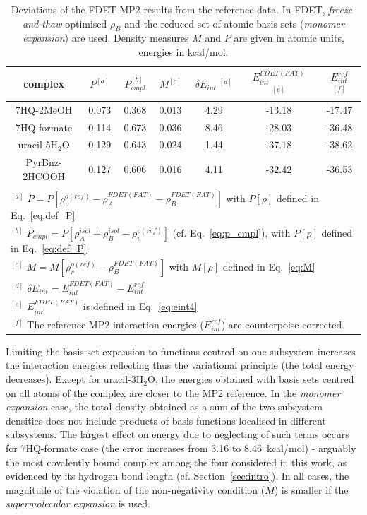 \documentclass[amsmath,amssymb,preprint,aip,jcp]{revtex4-1}
\begin{document}
\begin{table}
{
\begin{center}
\begin{tabular}{|c|c|c|c|c|c|c|}
\hline
 complex & $P^{[a]}$ & $P_{cmpl}^{[b]}$ & $M^{[c]}$ & $\delta E_{int}\;^{[d]}$ & $E^{FDET(FAT)}_{int}$ $^{[e]}$ & $E_{int}^{ref}$ $^{[f]}$ \\ \hline
7HQ-2MeOH & 0.073 & 0.368 & 0.013 & 4.29 & -13.18 & -17.47 \\ \hline
7HQ-formate & 0.114 & 0.673 & 0.036 & 8.46 & -28.03 & -36.48 \\ \hline
uracil-5H$_2$O & 0.129 & 0.643 & 0.024 & 1.44 & -37.18 & -38.62 \\ \hline
PyrBnz-2HCOOH & 0.127 & 0.606 & 0.016 & 4.11 & -32.42 & -36.53 \\ \hline
\multicolumn{7}{c}{ } \\
\multicolumn{7}{l}{$^{[a]}$ $P=P[\rho_v^{o(ref)} - \rho_{A}^{FDET(FAT)}-\rho_B^{FDET(FAT)}]$  with $P[\rho]$ defined in Eq.~\ref{eq:def_P}}\\
\multicolumn{7}{l}{$^{[b]}$ $P_{cmpl}=P[\rho_A^{isol}+\rho_B^{isol} - \rho_v^{o(ref)}]$ (cf. Eq.~\ref{eq:p_cmpl}), with $P[\rho]$ defined in Eq.~\ref{eq:def_P}}\\
\multicolumn{7}{l}{$^{[c]}$ $M=M[\rho_v^{o(ref)} - \rho^{FDET(FAT)}_{B}]$ with $M[\rho]$ defined in Eq.~\ref{eq:M}}\\
\multicolumn{7}{l}{$^{[d]}$ $\delta E_{int}=E^{FDET(FAT)}_{int}-E_{int}^{ref}$} \\
\multicolumn{7}{l}{$^{[e]}$ $E^{FDET(FAT)}_{int}$ is defined in Eq.~\ref{eq:eint4}}\\
\multicolumn{7}{l}{$^{[f]}$ The reference MP2 interaction energies ($E_{int}^{ref}$) are counterpoise corrected.}
\end{tabular}
\end{center}
}%
\caption{Deviations of the FDET-MP2 results from the reference data. In FDET, \textit{freeze-and-thaw} optimised $\rho_B$ and the reduced set of atomic basis sets ({\it monomer expansion}) are used. Density measures $M$ and $P$ are given in atomic units, energies in kcal/mol.
}
\label{table:ME_FAT}
\end{table}

Limiting the basis set expansion to functions centred on one subsystem increases the interaction energies reflecting thus the variational principle (the total energy decreases). Except for uracil-3H$_2$O, the energies obtained with basis sets centred on all atoms of the complex are closer to the MP2 reference. In the {\it monomer expansion} case, the total density obtained as a sum of the two subsystem densities
does not include products of basis functions localised in different subsystems. The largest effect on energy due to neglecting of such terms occurs for 7HQ-formate case (the error increases from 3.16 to 8.46~kcal/mol) - arguably the most covalently bound complex among the four considered in this work, as evidenced by its hydrogen bond length (cf. Section~\ref{sec:intro}). In all cases, the magnitude of the violation of the non-negativity condition ($M$) is smaller if the {\it supermolecular expansion} is used. 
\end{document}
